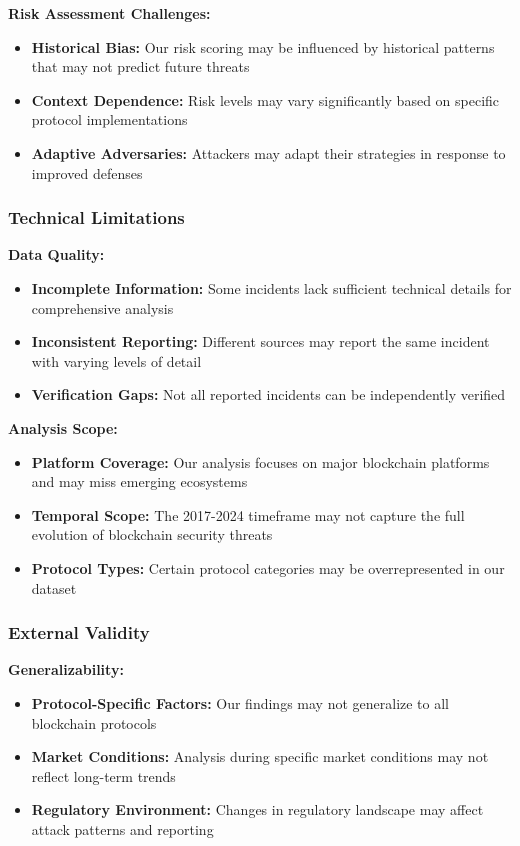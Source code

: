 \textbf{Risk Assessment Challenges:}
\begin{itemize}
    \item \textbf{Historical Bias:} Our risk scoring may be influenced by historical patterns that may not predict future threats
    \item \textbf{Context Dependence:} Risk levels may vary significantly based on specific protocol implementations
    \item \textbf{Adaptive Adversaries:} Attackers may adapt their strategies in response to improved defenses
\end{itemize}

\subsubsection{Technical Limitations}
\textbf{Data Quality:}
\begin{itemize}
    \item \textbf{Incomplete Information:} Some incidents lack sufficient technical details for comprehensive analysis
    \item \textbf{Inconsistent Reporting:} Different sources may report the same incident with varying levels of detail
    \item \textbf{Verification Gaps:} Not all reported incidents can be independently verified
\end{itemize}

\textbf{Analysis Scope:}
\begin{itemize}
    \item \textbf{Platform Coverage:} Our analysis focuses on major blockchain platforms and may miss emerging ecosystems
    \item \textbf{Temporal Scope:} The 2017-2024 timeframe may not capture the full evolution of blockchain security threats
    \item \textbf{Protocol Types:} Certain protocol categories may be overrepresented in our dataset
\end{itemize}

\subsubsection{External Validity}
\textbf{Generalizability:}
\begin{itemize}
    \item \textbf{Protocol-Specific Factors:} Our findings may not generalize to all blockchain protocols
    \item \textbf{Market Conditions:} Analysis during specific market conditions may not reflect long-term trends
    \item \textbf{Regulatory Environment:} Changes in regulatory landscape may affect attack patterns and reporting
\end{itemize}

